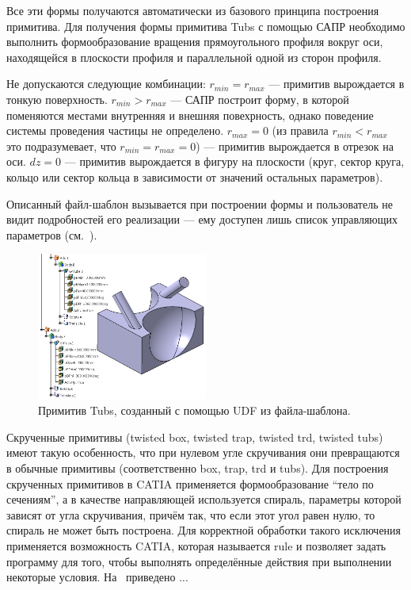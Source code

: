 Все эти формы получаются автоматически из базового принципа построения примитива.
Для получения формы примитива Tubs с помощью САПР необходимо выполнить формообразование вращения прямоугольного профиля вокруг оси, находящейся в плоскости профиля и параллельной одной из сторон профиля.

Не допускаются следующие комбинации:
$r_{min} = r_{max}$ --- примитив вырождается в тонкую поверхность.
$r_{min} > r_{max}$ --- САПР построит форму, в которой поменяются местами внутренняя и внешняя повехрность, однако поведение системы проведения частицы не определено.
$r_{max} = 0$ (из правила $r_{min} < r_{max}$ это подразумевает, что $r_{min} = r_{max} = 0$) --- примитив вырождается в отрезок на оси.
$dz = 0$ --- примитив вырождается в фигуру на плоскости (круг, сектор круга, кольцо или сектор кольца в зависимости от значений остальных параметров).

Описанный файл-шаблон вызывается при построении формы и пользователь не видит подробностей его реализации --- ему доступен лишь список управляющих параметров (см.~).

\begin{figure}[H]
\centering
\includegraphics[width=0.5\textwidth]{pictures/UDF_instance.png}
\caption{Примитив Tubs, созданный с помощью UDF из файла-шаблона.}
\label{fig:UDFinstance}
\end{figure}


\bigskip


Скрученные примитивы (twisted box, twisted trap, twisted trd, twisted tubs) имеют такую особенность, что при нулевом угле скручивания они превращаются в обычные примитивы (соответственно box, trap, trd и tubs). Для построения скрученных примитивов в CATIA применяется формообразование ``тело по сечениям'', а в качестве направляющей используется спираль, параметры которой зависят от угла скручивания, причём так, что если этот угол равен нулю, то спираль не может быть построена. Для корректной обработки такого исключения применяется возможность CATIA, которая называется rule и позволяет задать программу для того, чтобы выполнять определённые действия при выполнении некоторые условия.
На~ приведено ...
\todo

